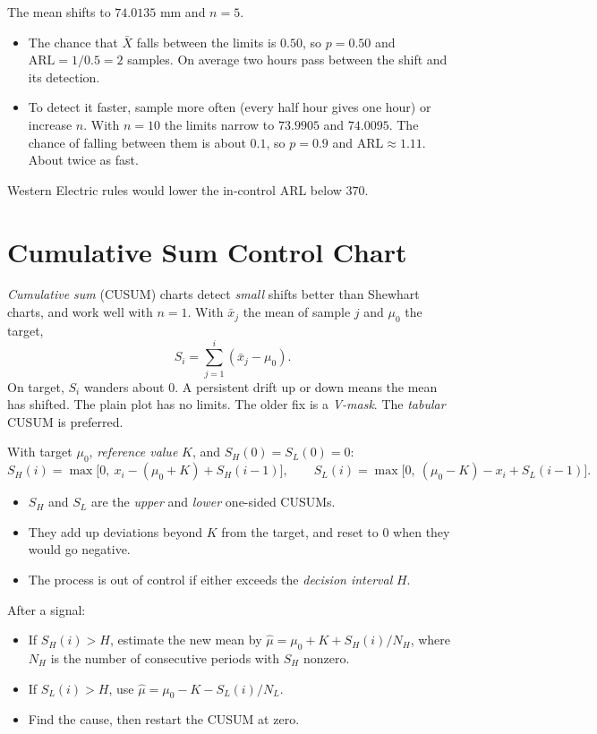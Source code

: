 \begin{example}
The mean shifts to $74.0135$ mm and $n=5$.
\begin{itemize}
  \item The chance that $\bar{X}$ falls between the limits is $0.50$, so $p=0.50$ and $\mathrm{ARL}=1/0.5=2$ samples. On average two hours pass between the shift and its detection.
  \item To detect it faster, sample more often (every half hour gives one hour) or increase $n$. With $n=10$ the limits narrow to $73.9905$ and $74.0095$. The chance of falling between them is about $0.1$, so $p=0.9$ and $\mathrm{ARL}\approx1.11$. About twice as fast.
\end{itemize}
Western Electric rules would lower the in-control ARL below $370$.
\end{example}

\section{Cumulative Sum Control Chart}\label{sec:cusum}

\emph{Cumulative sum} (CUSUM) charts detect \emph{small} shifts better than Shewhart charts, and work well with $n=1$. With $\bar{x}_j$ the mean of sample $j$ and $\mu_0$ the target,
\[ S_i=\sum_{j=1}^i(\bar{x}_j-\mu_0). \]
On target, $S_i$ wanders about $0$. A persistent drift up or down means the mean has shifted. The plain plot has no limits. The older fix is a \emph{V-mask}. The \emph{tabular} CUSUM is preferred.

\begin{definition}
With target $\mu_0$, \emph{reference value} $K$, and $S_H(0)=S_L(0)=0$:
\[ S_H(i)=\max\big[0,\ x_i-(\mu_0+K)+S_H(i-1)\big],\qquad S_L(i)=\max\big[0,\ (\mu_0-K)-x_i+S_L(i-1)\big]. \]
\begin{itemize}
  \item $S_H$ and $S_L$ are the \emph{upper} and \emph{lower} one-sided CUSUMs.
  \item They add up deviations beyond $K$ from the target, and reset to $0$ when they would go negative.
  \item The process is out of control if either exceeds the \emph{decision interval} $H$.
\end{itemize}
\end{definition}

After a signal:
\begin{itemize}
  \item If $S_H(i)>H$, estimate the new mean by $\hat\mu=\mu_0+K+S_H(i)/N_H$, where $N_H$ is the number of consecutive periods with $S_H$ nonzero.
  \item If $S_L(i)>H$, use $\hat\mu=\mu_0-K-S_L(i)/N_L$.
  \item Find the cause, then restart the CUSUM at zero.
\end{itemize}

